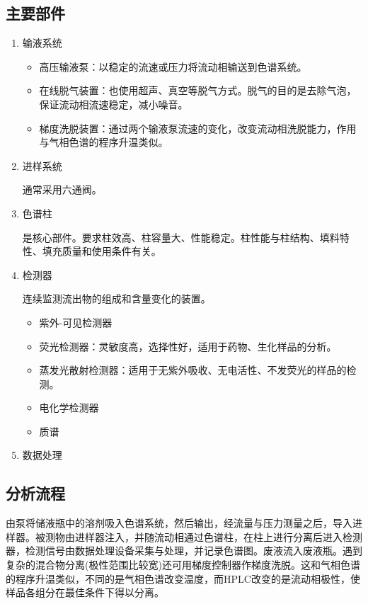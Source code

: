 \subsection{主要部件}
\begin{enumerate}
	\item 输液系统
	\begin{itemize}
		\item 高压输液泵：以稳定的流速或压力将流动相输送到色谱系统。
		\item 在线脱气装置：也使用超声、真空等脱气方式。脱气的目的是去除气泡，保证流动相流速稳定，减小噪音。
		\item 梯度洗脱装置：通过两个输液泵流速的变化，改变流动相洗脱能力，作用与气相色谱的程序升温类似。
	\end{itemize}
	\item 进样系统
	
	通常采用六通阀。
	\item 色谱柱
	
	是核心部件。要求柱效高、柱容量大、性能稳定。柱性能与柱结构、填料特性、填充质量和使用条件有关。
	\item 检测器
	
	连续监测流出物的组成和含量变化的装置。
	\begin{itemize}
		\item 紫外-可见检测器
		\item 荧光检测器：灵敏度高，选择性好，适用于药物、生化样品的分析。
		\item 蒸发光散射检测器：适用于无紫外吸收、无电活性、不发荧光的样品的检测。
		\item 电化学检测器
		\item 质谱
	\end{itemize}
	\item 数据处理
\end{enumerate}

\subsection{分析流程}
由泵将储液瓶中的溶剂吸入色谱系统，然后输出，经流量与压力测量之后，导入进样器。被测物由进样器注入，并随流动相通过色谱柱，在柱上进行分离后进入检测器，检测信号由数据处理设备采集与处理，并记录色谱图。废液流入废液瓶。遇到复杂的混合物分离(极性范围比较宽)还可用梯度控制器作梯度洗脱。这和气相色谱的程序升温类似，不同的是气相色谱改变温度，而HPLC改变的是流动相极性，使样品各组分在最佳条件下得以分离。

